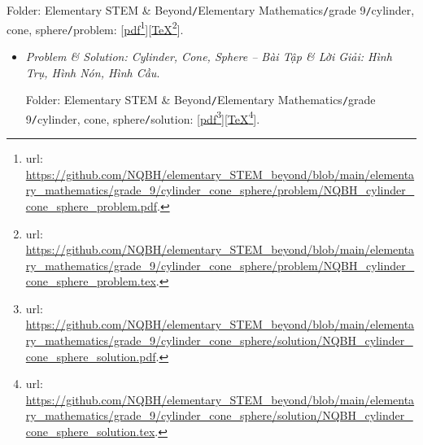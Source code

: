 \documentclass[12pt]{article}
\begin{document}
\begin{itemize}
\begin{center}
	\end{center}
	Folder: {\sf Elementary STEM \& Beyond{\tt/}Elementary Mathematics{\tt/}grade 9{\tt/}cylinder, cone, sphere{\tt/}problem}: [\href{https://github.com/NQBH/elementary_STEM_beyond/blob/main/elementary_mathematics/grade_9/cylinder_cone_sphere/problem/NQBH_cylinder_cone_sphere_problem.pdf}{pdf}\footnote{{\sc url}: \url{https://github.com/NQBH/elementary_STEM_beyond/blob/main/elementary_mathematics/grade_9/cylinder_cone_sphere/problem/NQBH_cylinder_cone_sphere_problem.pdf}.}][\href{https://github.com/NQBH/elementary_STEM_beyond/blob/main/elementary_mathematics/grade_9/cylinder_cone_sphere/problem/NQBH_cylinder_cone_sphere_problem.tex}{\TeX}\footnote{{\sc url}: \url{https://github.com/NQBH/elementary_STEM_beyond/blob/main/elementary_mathematics/grade_9/cylinder_cone_sphere/problem/NQBH_cylinder_cone_sphere_problem.tex}.}].
	\begin{itemize}
		\item  {\it Problem \& Solution: Cylinder, Cone, Sphere -- Bài Tập \& Lời Giải: Hình Trụ, Hình Nón, Hình Cầu}.
		
		Folder: {\sf Elementary STEM \& Beyond{\tt/}Elementary Mathematics{\tt/}grade 9{\tt/}cylinder, cone, sphere{\tt/}solution}: [\href{https://github.com/NQBH/elementary_STEM_beyond/blob/main/elementary_mathematics/grade_9/cylinder_cone_sphere/solution/NQBH_cylinder_cone_sphere_solution.pdf}{pdf}\footnote{{\sc url}: \url{https://github.com/NQBH/elementary_STEM_beyond/blob/main/elementary_mathematics/grade_9/cylinder_cone_sphere/solution/NQBH_cylinder_cone_sphere_solution.pdf}.}][\href{https://github.com/NQBH/elementary_STEM_beyond/blob/main/elementary_mathematics/grade_9/cylinder_cone_sphere/solution/NQBH_cylinder_cone_sphere_solution.tex}{\TeX}\footnote{{\sc url}: \url{https://github.com/NQBH/elementary_STEM_beyond/blob/main/elementary_mathematics/grade_9/cylinder_cone_sphere/solution/NQBH_cylinder_cone_sphere_solution.tex}.}].
	\end{itemize}

\end{itemize}
\end{document}
